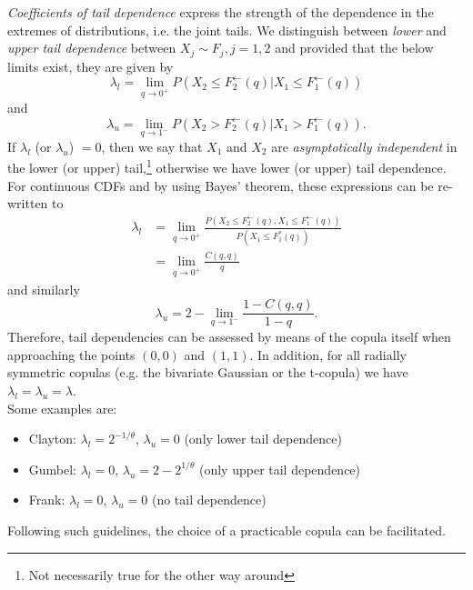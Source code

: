 
\textit{Coefficients of tail dependence} express the strength of the dependence in the extremes of distributions, i.e. the joint tails. We distinguish between \textit{lower} and \textit{upper tail dependence} between $X_j \sim F_j, j = 1,2$ and provided that the below limits exist, they are given by
\begin{equation}
\lambda_{l}=\lim \limits _ {q \rightarrow 0^+} P \left(X_{2} \leq F_{2}^{\leftarrow}(q) | X_{1} \leq F_{1}^{\leftarrow}(q)\right) 
\label{eq:lower_tail_dependence}
\end{equation}
and 
\begin{equation}
\lambda_{u}=\lim \limits _ {q \rightarrow 1^-} P \left(X_{2} > F_{2}^{\leftarrow}(q) | X_{1} > F_{1}^{\leftarrow}(q)\right).
\label{eq:upper_tail_dependence}
\end{equation}
If $\lambda_l$ (or $\lambda_u$) $=0$, then we say that $X_1$ and $X_2$ are \textit{asymptotically independent} in the lower (or upper) tail,\footnote{Not necessarily true for the other way around} otherwise we have lower (or upper) tail dependence.\\
For continuous \acp{CDF} and by using Bayes' theorem, these expressions can be re-written to
$$
\begin{aligned}
\lambda_{l} &=\lim _{q \rightarrow 0^+} \frac{P\left(X_{2} \leq F_{2}^{\leftarrow}(q), X_{1} \leq F_{1}^{\leftarrow}(q)\right)}{P\left(X_{1} \leq F_{1}^{*}(q)\right)} \\
&=\lim _{q \rightarrow 0^+} \frac{C(q, q)}{q}
\end{aligned}
$$
and similarly
$$
\lambda_u = 2-\lim _{q \rightarrow 1^-} \frac{1-C(q, q)}{1-q}.
$$
Therefore, tail dependencies can be assessed by means of the copula itself when approaching the points $(0,0)$ and $(1,1)$. In addition, for all radially symmetric copulas (e.g. the bivariate Gaussian or the t-copula) we have $\lambda_l = \lambda_u = \lambda$.\\
Some examples are:
\begin{itemize}
\item Clayton: $\lambda_l = 2^{-1/ \theta}$, $\lambda_u = 0$ (only lower tail dependence)
\item Gumbel: $\lambda_l = 0$, $\lambda_u = 2 - 2^{1/ \theta}$ (only upper tail dependence)
\item Frank: $\lambda_l = 0$, $\lambda_u = 0$ (no tail dependence)
\end{itemize}
Following such guidelines, the choice of a practicable copula can be facilitated.




